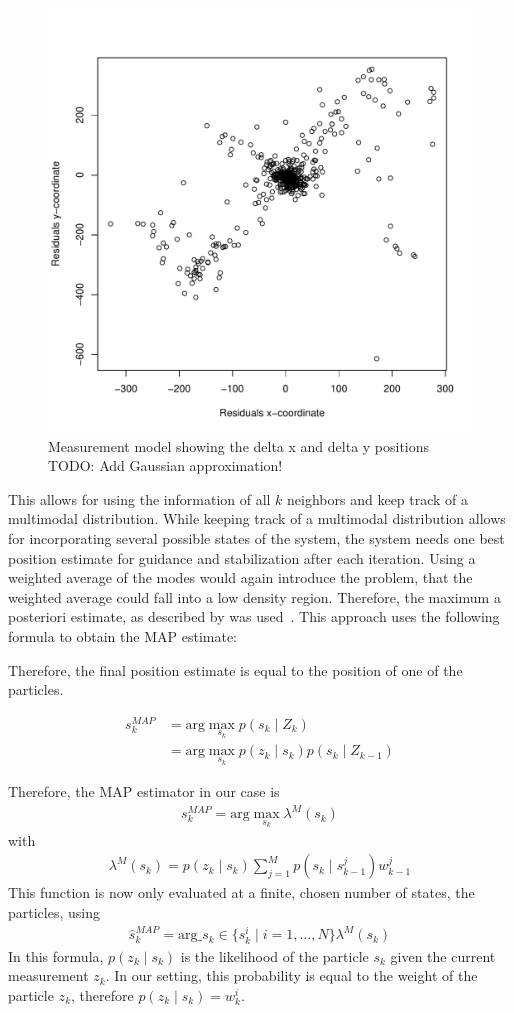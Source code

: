 \documentclass{report}
\begin{document}
\begin{figure}[h!]
\label{fig:measurementmodel}
\begin{center}
\includegraphics[width=0.448\columnwidth]{measurement_model}
\caption{{Measurement model showing the delta x and delta y
    positions
TODO: Add Gaussian approximation!%
}}
\end{center}
\end{figure}

This allows for using the information of all $k$ neighbors and keep
track of a multimodal distribution. While keeping track of a
multimodal distribution allows for incorporating several possible
states of the system, the system needs one best position estimate for
guidance and stabilization after each iteration. Using a weighted
average of the modes would again introduce the problem, that the
weighted average could fall into a low density region. Therefore, the
maximum a posteriori estimate, as described by
\citeauthor{driessen2008map} was used~\cite{driessen2008map}. This
approach uses the following formula to obtain the MAP estimate:

Therefore, the final position estimate is equal to the position of one
of the particles.

\begin{align}
  s_k^{MAP}  &= \text{arg}\max_{s_k}{p(s_k \mid Z_k)}\\
             &= \text{arg}\max_{s_k}{p(z_k \mid s_k) p(s_k \mid Z_{k-1})} 
\end{align}

Therefore, the MAP estimator in our case is
\begin{align}
s_k^{MAP} = \text{arg}\max_{s_k} \lambda^M(s_k)
\end{align}
with
\begin{align}
\lambda^M(s_k) = p(z_k \mid s_k) \sum_{j=1}^Mp(s_k \mid s_{k-1}^j)w^j_{k-1}
\end{align}
This function is now only evaluated at a finite, chosen number of
states, the particles, using
\begin{align}
\hat{s}_k^{MAP} = \text{arg}\_{s_k \in \{s_k^i \mid i=1,\ldots,N\}} \lambda^M(s_k)
\end{align}
In this formula, $p(z_k \mid s_k)$ is the likelihood of the particle
$s_k$ given the current measurement $z_k$. In our setting, this
probability is equal to the weight of the particle $z_k$, therefore
$p(z_k \mid s_k) = w^i_k$.
\end{document}

